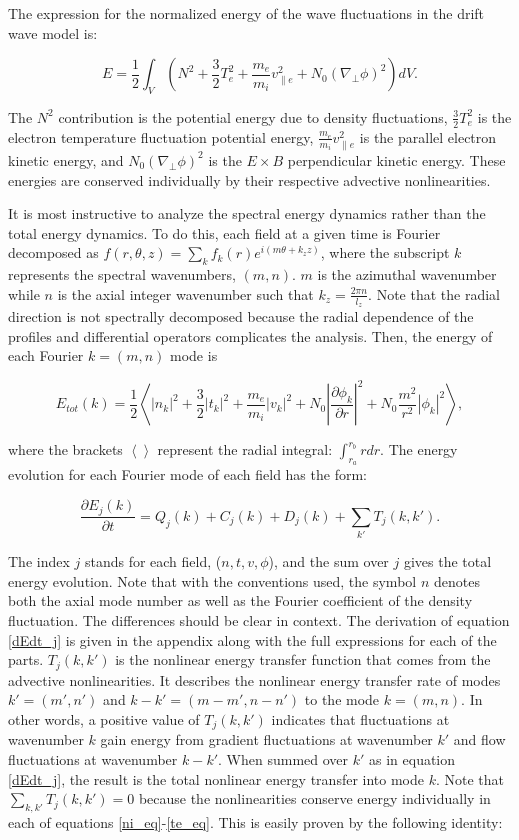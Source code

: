\documentclass[showpacs,preprintnumbers,amsmath,amssymb,superscriptaddress]{revtex4}
\def\beq{\begin{equation}}
\def\eeq{\end{equation}}
\newcommand{\pdiff}[2]{\frac{\partial#1}{\partial#2}}
\def\grad{\nabla}
\newcommand{\gradperp}{\grad_\perp}
\newcommand{\vpe}{v_{\parallel e}}
\begin{document}
The expression for the normalized energy of the wave fluctuations in the drift wave model is:

\beq
\label{energy_eq}
E = \frac{1}{2} \int_V  (N^2 + \frac{3}{2} T_e^2 + \frac{m_e}{m_i} \vpe^2 + N_0 (\gradperp \phi)^2 ) dV.
\eeq

The $N^2$ contribution is the potential energy due to density fluctuations, $\frac{3}{2} T_e^2$ is the electron temperature fluctuation potential energy,
$\frac{m_e}{m_i} \vpe^2$ is the parallel electron kinetic energy, and $N_0 (\gradperp \phi)^2$ is the $E \times B$ perpendicular kinetic energy.
These energies are conserved individually by their respective advective nonlinearities.

It is most instructive to analyze the spectral energy dynamics rather than the total energy dynamics. To do this, each field at a given time is Fourier decomposed as 
$f(r,\theta,z) = \sum_k f_k(r) e^{i (m \theta + k_z z )}$,
where the subscript $k$ represents the spectral wavenumbers, $(m,n)$. $m$ is the azimuthal wavenumber while $n$ is the axial integer wavenumber such that $k_z = \frac{2 \pi n}{l_z}$. Note that
the radial direction is not spectrally decomposed because the radial dependence of the profiles and differential operators complicates the analysis.
Then, the energy of each Fourier $k = (m,n)$ mode is

\beq
\label{E_k}
E_{tot}(k) = \frac{1}{2} \left< |n_k|^2 + \frac{3}{2} |t_k|^2 + \frac{m_e}{m_i} |v_k|^2 + N_0 \left| \pdiff{\phi_k}{r} \right|^2 + N_0 \frac{m^2}{r^2} |\phi_k|^2 \right>,
\eeq

where the brackets $\left< \right>$ represent the radial integral: $\int_{r_a}^{r_b} r dr$. 
The energy evolution for each Fourier mode of each field has the form:

\beq
\label{dEdt_j}
\pdiff{E_{j}(k)}{t} = Q_{j}(k) + C_{j}(k) + D_j(k) + \sum_{k'} T_{j}(k,k').
\eeq

The index $j$ stands for each field, ($n,t,v,\phi$), and the sum over $j$ gives the total energy evolution. Note that with the conventions used, the symbol $n$ denotes both the axial mode number as
well as the Fourier coefficient of the density fluctuation. The differences should be clear in context. The derivation of equation \ref{dEdt_j} 
is given in the appendix along with the full expressions for each of the parts. $T_{j}(k,k')$ is the nonlinear energy transfer function that comes from the advective
nonlinearities.  It describes the nonlinear energy transfer rate of modes $k'=(m',n')$ and $k-k'=(m-m',n-n')$ to the mode $k=(m,n)$. 
In other words, a positive value of $T_{j}(k,k')$ indicates that fluctuations
at wavenumber $k$ gain energy from gradient fluctuations at wavenumber $k'$ and flow fluctuations at wavenumber $k-k'$.
When summed over $k'$ as in equation \ref{dEdt_j}, the result is the total
nonlinear energy transfer into mode $k$. Note that $\sum_{k,k'} T_{j}(k,k') = 0$ because the nonlinearities conserve energy individually in each of equations \ref{ni_eq}-\ref{te_eq}.
This is easily proven by the following identity:
\end{document}

